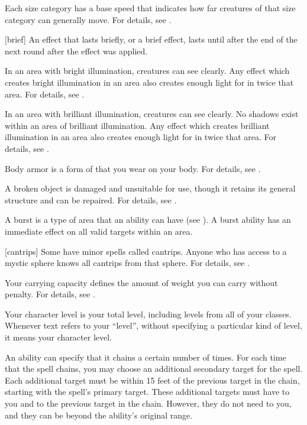  Each size category has a base speed that indicates how far creatures of that size category can generally move.
For details, see .

[brief] An effect that lasts briefly, or a brief effect, lasts until after the end of the next round after the effect was applied.

 In an area with bright illumination, creatures can see clearly.
Any effect which creates bright illumination in an area also creates enough light for  in twice that area.
For details, see .

 In an area with brilliant illumination, creatures can see clearly.
No shadows exist within an area of brilliant illumination.
Any effect which creates brilliant illumination in an area also creates enough light for  in twice that area.
For details, see .

 Body armor is a form of  that you wear on your body.
For details, see .

 A broken object is damaged and unsuitable for use, though it retains its general structure and can be repaired.
For details, see .

 A burst is a type of area that an ability can have (see ).
A burst ability has an immediate effect on all valid targets within an area.

[cantrips] Some  have minor spells called cantrips.
Anyone who has access to a mystic sphere knows all cantrips from that sphere.
For details, see .

 Your carrying capacity defines the amount of weight you can carry without penalty.
For details, see .

 Your character level is your total level, including levels from all of your classes.
Whenever text refers to your ``level'', without specifying a particular kind of level, it means your character level.

 An ability can specify that it chains a certain number of times.
For each time that the spell chains, you may choose an additional secondary target for the spell.
Each additional target must be within 15 feet of the previous target in the chain, starting with the spell's primary target.
These additional targets must have  to you and  to the previous target in the chain.
However, they do not need  to you, and they can be beyond the ability's original range.

